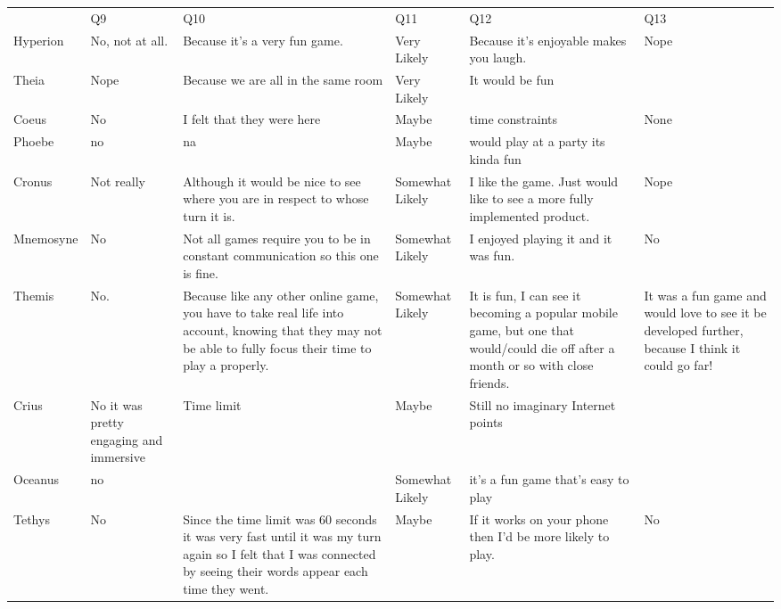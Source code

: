 \documentclass{sigchi}
\begin{document}
\begin{table}[ht]
\begin{tabularx}{\linewidth}{>{\raggedright}X | >{\raggedright}X | >{\raggedright}X | >{\raggedright}X | >{\raggedright}X | >{\raggedright}X}
 & Q9 & Q10 & Q11 & Q12 & Q13 \tabularnewline
Hyperion & No, not at all.  & Because it's a very fun game.  & Very Likely & Because it's enjoyable makes you laugh.  & Nope  \tabularnewline \hline
Theia & Nope & Because we are all in the same room & Very Likely & It would be fun &  \tabularnewline \hline
Coeus & No & I felt that they were here & Maybe & time constraints & None \tabularnewline \hline
Phoebe & no & na & Maybe & would play at a party its kinda fun &  \tabularnewline \hline
Cronus & Not really & Although it would be nice to see where you are in respect to whose turn it is. & Somewhat Likely & I like the game. Just would like to see a more fully implemented product. & Nope \tabularnewline \hline
Mnemosyne & No & Not all games require you to be in constant communication so this one is fine.  & Somewhat Likely & I enjoyed playing it and it was fun.  & No \tabularnewline \hline
Themis & No. & Because like any other online game, you have to take real life into account, knowing that they may not be able to fully focus their time to play a properly. & Somewhat Likely & It is fun, I can see it becoming a popular mobile game, but one that would/could die off after a month or so with close friends.  & It was a fun game and would love to see it be developed further, because I think it could go far! \tabularnewline \hline
Crius  & No it was pretty engaging and immersive & Time limit & Maybe & Still no imaginary Internet points &  \tabularnewline \hline
Oceanus & no &  & Somewhat Likely & it's a fun game that's easy to play &  \tabularnewline \hline
Tethys & No & Since the time limit was 60 seconds it was very fast until it was my turn again so I felt that I was connected by seeing their words appear each time they went. & Maybe & If it works on your phone then I'd be more likely to play. & No \tabularnewline
\end{tabularx}
\end{table}
\FloatBarrier


\label{apx:conceptual}
\end{document}
